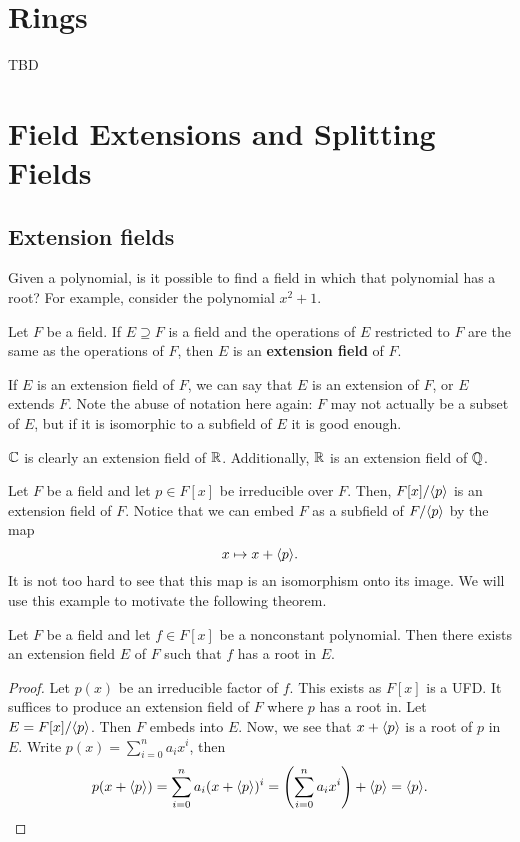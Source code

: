 \documentclass[oneside]{book}
\begin{document}
\chapter{Rings}
TBD
 
\chapter{Field Extensions and Splitting Fields}

\section{Extension fields}
Given a polynomial, is it possible to find a field in which that polynomial has
a root? For example, consider the polynomial $x^2 + 1$. 

\begin{definition}
    Let $F$ be a field. If $E \supseteq F$ is a field and the operations of $E$
    restricted to $F$ are the same as the operations of $F$, then $E$ is an
    \textbf{extension field} of $F$.
\end{definition}
If $E$ is an extension field of $F$, we can say that $E$ is an extension of $F$,
or $E$ extends $F$. Note the abuse of notation here again: $F$ may not actually
be a subset of $E$, but if it is isomorphic to a subfield of $E$ it is good
enough.

\begin{example}
    $\mathbb{C}$ is clearly an extension field of $\mathbb{R}$. Additionally, $\mathbb{R}$ is an
    extension field of $\mathbb{Q}$.
\end{example}

\begin{example}
    Let $F$ be a field and let $p \in F[x]$ be irreducible over $F$. Then,
    $F[x]/{ \langle p \rangle }$ is an extension field of $F$. Notice that we can embed $F$ as
    a subfield of $F/{ \langle p \rangle }$ by the map 
    \[
        x \mapsto x + { \langle p \rangle }.
    \]
    It is not too hard to see that this map is an isomorphism onto its image. We
    will use this example to motivate the following theorem.
\end{example}

\begin{theorem}
\label{thm:extension-fields-exist}
    Let $F$ be a field and let $f \in F[x]$ be a nonconstant polynomial. Then
    there exists an extension field $E$ of $F$ such that $f$ has a root in $E$.
\end{theorem}
\begin{proof}
    Let $p(x)$ be an irreducible factor of $f$. This exists as $F[x]$ is a UFD.
    It suffices to produce an extension field of $F$ where $p$ has a root in.
    Let $E = F[x] / { \langle p \rangle }$. Then $F$ embeds into $E$. Now, we see that $x +
    { \langle p \rangle }$ is a root of $p$ in $E$. Write $p(x) = \sum_{i=0}^n a_i x^i$, then 
    \[ 
        p(x + \gen{p}) = \sum_{i=0}^n a_i (x+\gen{p})^i =  \paren{\sum_{i=0}^n a_i x^i} + \gen{p} = \gen{p}.
    \]
\end{proof}
\end{document}
